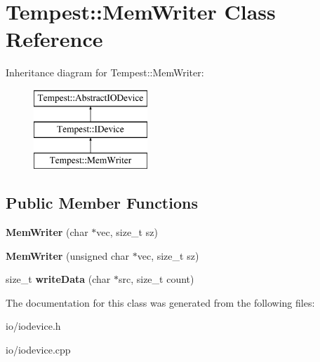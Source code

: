 \hypertarget{class_tempest_1_1_mem_writer}{\section{Tempest\+:\+:Mem\+Writer Class Reference}
\label{class_tempest_1_1_mem_writer}
}
Inheritance diagram for Tempest\+:\+:Mem\+Writer\+:\begin{figure}[H]
\begin{center}
\leavevmode
\includegraphics[height=3.000000cm]{class_tempest_1_1_mem_writer}
\end{center}
\end{figure}
\subsection*{Public Member Functions}
\begin{DoxyCompactItemize}
\item 
\hypertarget{class_tempest_1_1_mem_writer_aa20c388342a7939837fa5ee1b53db764}{{\bfseries Mem\+Writer} (char $\ast$vec, size\+\_\+t sz)}\label{class_tempest_1_1_mem_writer_aa20c388342a7939837fa5ee1b53db764}

\item 
\hypertarget{class_tempest_1_1_mem_writer_a8b6b7221970053fca5b8d730d43d81e9}{{\bfseries Mem\+Writer} (unsigned char $\ast$vec, size\+\_\+t sz)}\label{class_tempest_1_1_mem_writer_a8b6b7221970053fca5b8d730d43d81e9}

\item 
\hypertarget{class_tempest_1_1_mem_writer_afd6f03c7d6bc95ffe4c82f49ab82a29e}{size\+\_\+t {\bfseries write\+Data} (char $\ast$src, size\+\_\+t count)}\label{class_tempest_1_1_mem_writer_afd6f03c7d6bc95ffe4c82f49ab82a29e}

\end{DoxyCompactItemize}


The documentation for this class was generated from the following files\+:\begin{DoxyCompactItemize}
\item 
io/iodevice.\+h\item 
io/iodevice.\+cpp\end{DoxyCompactItemize}
